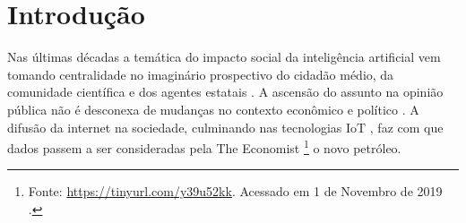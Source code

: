 \documentclass[
	12pt,				%
	openany,			%
	oneside,			%
	a4paper,			%
	english,			%
	french,				%
	spanish,			%
	brazil,				%
	]{abntex2}
\begin{document}
\frenchspacing 


\imprimircapa

\imprimirfolhaderosto


\listoffigures*
\cleardoublepage

\listoftables*
\cleardoublepage


\tableofcontents*
\cleardoublepage


\textual

\chapter*[Introdução]{Introdução}


Nas últimas décadas a temática do impacto social da inteligência artificial vem
tomando centralidade no imaginário prospectivo do cidadão médio, da comunidade
científica e dos agentes estatais \cite{cameron1991terminator,
  cockburn2018impact, makridakis2017forthcoming}. A ascensão do assunto na
opinião pública não é desconexa de mudanças no contexto econômico e político
\cite{kogut2003global}. A difusão da internet na sociedade, culminando nas
tecnologias IoT \cite{gubbi2013internet}, faz com que dados passem a ser
consideradas pela The Economist \footnote{Fonte:
  \url{https://tinyurl.com/y39u52kk}.
  Acessado em 1 de Novembro de 2019 .} o novo petróleo.
\end{document}
